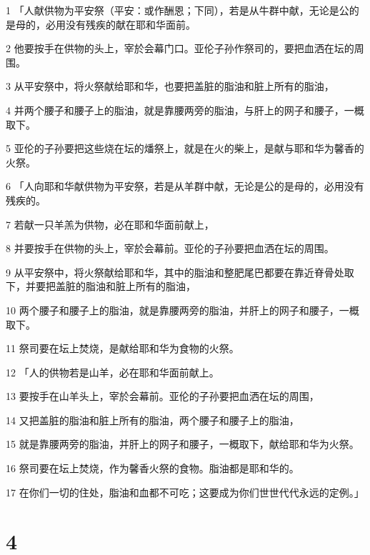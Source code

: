 \par 1 「人献供物为平安祭（平安：或作酬恩；下同），若是从牛群中献，无论是公的是母的，必用没有残疾的献在耶和华面前。
\par 2 他要按手在供物的头上，宰於会幕门口。亚伦子孙作祭司的，要把血洒在坛的周围。
\par 3 从平安祭中，将火祭献给耶和华，也要把盖脏的脂油和脏上所有的脂油，
\par 4 并两个腰子和腰子上的脂油，就是靠腰两旁的脂油，与肝上的网子和腰子，一概取下。
\par 5 亚伦的子孙要把这些烧在坛的燔祭上，就是在火的柴上，是献与耶和华为馨香的火祭。
\par 6 「人向耶和华献供物为平安祭，若是从羊群中献，无论是公的是母的，必用没有残疾的。
\par 7 若献一只羊羔为供物，必在耶和华面前献上，
\par 8 并要按手在供物的头上，宰於会幕前。亚伦的子孙要把血洒在坛的周围。
\par 9 从平安祭中，将火祭献给耶和华，其中的脂油和整肥尾巴都要在靠近脊骨处取下，并要把盖脏的脂油和脏上所有的脂油，
\par 10 两个腰子和腰子上的脂油，就是靠腰两旁的脂油，并肝上的网子和腰子，一概取下。
\par 11 祭司要在坛上焚烧，是献给耶和华为食物的火祭。
\par 12 「人的供物若是山羊，必在耶和华面前献上。
\par 13 要按手在山羊头上，宰於会幕前。亚伦的子孙要把血洒在坛的周围，
\par 14 又把盖脏的脂油和脏上所有的脂油，两个腰子和腰子上的脂油，
\par 15 就是靠腰两旁的脂油，并肝上的网子和腰子，一概取下，献给耶和华为火祭。
\par 16 祭司要在坛上焚烧，作为馨香火祭的食物。脂油都是耶和华的。
\par 17 在你们一切的住处，脂油和血都不可吃；这要成为你们世世代代永远的定例。」

\chapter{4}

